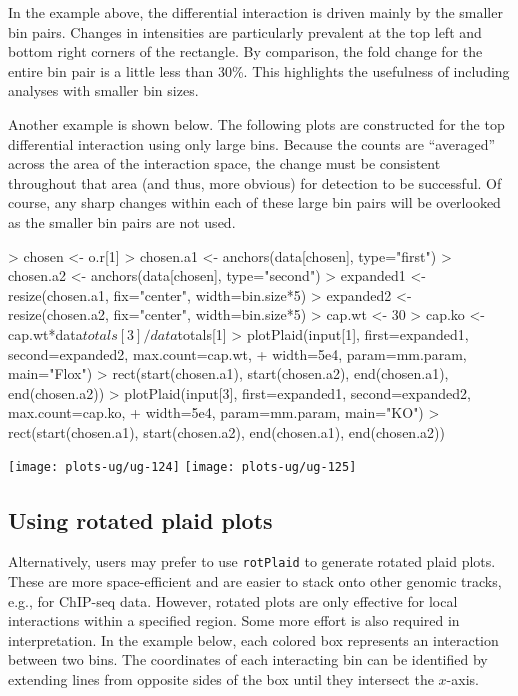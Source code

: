 \documentclass[12pt]{report}
\renewenvironment{Schunk}{\vspace{0pt}}{\vspace{0pt}}
\newcommand{\code}[1]{{\small\texttt{#1}}}
\begin{document}
In the example above, the differential interaction is driven mainly by the smaller bin pairs.
Changes in intensities are particularly prevalent at the top left and bottom right corners of the rectangle.
By comparison, the fold change for the entire bin pair is a little less than 30\%.
This highlights the usefulness of including analyses with smaller bin sizes.

Another example is shown below.
The following plots are constructed for the top differential interaction using only large bins.
Because the counts are ``averaged'' across the area of the interaction space, the change must be consistent throughout that area (and thus, more obvious) for detection to be successful.
Of course, any sharp changes within each of these large bin pairs will be overlooked as the smaller bin pairs are not used.




\begin{Schunk}
\begin{Sinput}
> chosen <- o.r[1]
> chosen.a1 <- anchors(data[chosen], type="first")
> chosen.a2 <- anchors(data[chosen], type="second")
> expanded1 <- resize(chosen.a1, fix="center", width=bin.size*5)
> expanded2 <- resize(chosen.a2, fix="center", width=bin.size*5)
> cap.wt <- 30
> cap.ko <- cap.wt*data$totals[3]/data$totals[1]
> plotPlaid(input[1], first=expanded1, second=expanded2, max.count=cap.wt, 
+     width=5e4, param=mm.param, main="Flox")
> rect(start(chosen.a1), start(chosen.a2), end(chosen.a1), end(chosen.a2))
> plotPlaid(input[3], first=expanded1, second=expanded2, max.count=cap.ko, 
+     width=5e4, param=mm.param, main="KO")
> rect(start(chosen.a1), start(chosen.a2), end(chosen.a1), end(chosen.a2))
\end{Sinput}
\end{Schunk}


\begin{center}
\texttt{[image: plots-ug/ug-124]}
\texttt{[image: plots-ug/ug-125]}
\end{center}

\subsection{Using rotated plaid plots}
Alternatively, users may prefer to use \code{rotPlaid} to generate rotated plaid plots.
These are more space-efficient and are easier to stack onto other genomic tracks, e.g., for ChIP-seq data.
However, rotated plots are only effective for local interactions within a specified region.
Some more effort is also required in interpretation.
In the example below, each colored box represents an interaction between two bins. 
The coordinates of each interacting bin can be identified by extending lines from opposite sides of the box until they intersect the $x$-axis.
\end{document}
